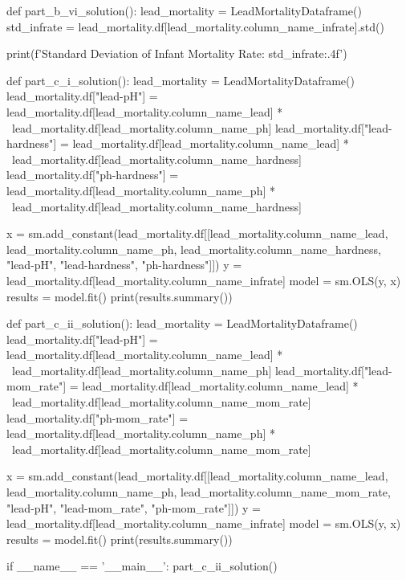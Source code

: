 \documentclass{uofa-eng-assignment}
\begin{document}
\begin{python}
def part_b_vi_solution():
    lead_mortality = LeadMortalityDataframe()
    std_infrate = lead_mortality.df[lead_mortality.column_name_infrate].std()

    print(f'Standard Deviation of Infant Mortality Rate: {std_infrate:.4f}')


def part_c_i_solution():
    lead_mortality = LeadMortalityDataframe()
    lead_mortality.df["lead-pH"] = lead_mortality.df[lead_mortality.column_name_lead] * \
        lead_mortality.df[lead_mortality.column_name_ph]
    lead_mortality.df["lead-hardness"] = lead_mortality.df[lead_mortality.column_name_lead] * \
        lead_mortality.df[lead_mortality.column_name_hardness]
    lead_mortality.df["ph-hardness"] = lead_mortality.df[lead_mortality.column_name_ph] * \
        lead_mortality.df[lead_mortality.column_name_hardness]

    x = sm.add_constant(lead_mortality.df[[lead_mortality.column_name_lead,
                                           lead_mortality.column_name_ph,
                                           lead_mortality.column_name_hardness,
                                           "lead-pH",
                                           "lead-hardness",
                                           "ph-hardness"]])
    y = lead_mortality.df[lead_mortality.column_name_infrate]
    model = sm.OLS(y, x)
    results = model.fit()
    print(results.summary())


def part_c_ii_solution():
    lead_mortality = LeadMortalityDataframe()
    lead_mortality.df["lead-pH"] = lead_mortality.df[lead_mortality.column_name_lead] * \
        lead_mortality.df[lead_mortality.column_name_ph]
    lead_mortality.df["lead-mom_rate"] = lead_mortality.df[lead_mortality.column_name_lead] * \
        lead_mortality.df[lead_mortality.column_name_mom_rate]
    lead_mortality.df["ph-mom_rate"] = lead_mortality.df[lead_mortality.column_name_ph] * \
        lead_mortality.df[lead_mortality.column_name_mom_rate]

    x = sm.add_constant(lead_mortality.df[[lead_mortality.column_name_lead,
                                           lead_mortality.column_name_ph,
                                           lead_mortality.column_name_mom_rate,
                                           "lead-pH",
                                           "lead-mom_rate",
                                           "ph-mom_rate"]])
    y = lead_mortality.df[lead_mortality.column_name_infrate]
    model = sm.OLS(y, x)
    results = model.fit()
    print(results.summary())


if __name__ == '__main__':
    part_c_ii_solution()

\end{python}
\end{document}
